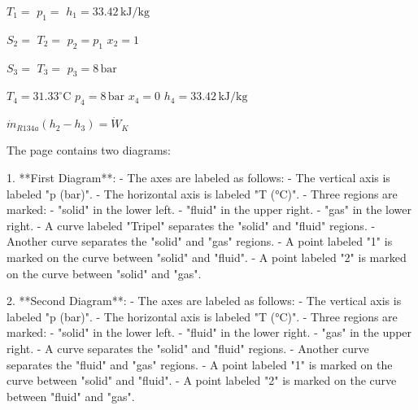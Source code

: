 \( T_1 = \)  
\( p_1 = \)  
\( h_1 = 33.42 \, \text{kJ/kg} \)  

\( S_2 = \)  
\( T_2 = \)  
\( p_2 = p_1 \)  
\( x_2 = 1 \)  

\( S_3 = \)  
\( T_3 = \)  
\( p_3 = 8 \, \text{bar} \)  

\( T_4 = 31.33^\circ \text{C} \)  
\( p_4 = 8 \, \text{bar} \)  
\( x_4 = 0 \)  
\( h_4 = 33.42 \, \text{kJ/kg} \)  

\( \dot{m}_{R134a} (h_2 - h_3) = \dot{W}_K \)

The page contains two diagrams:

1. **First Diagram**:
   - The axes are labeled as follows:
     - The vertical axis is labeled "p (bar)".
     - The horizontal axis is labeled "T (°C)".
   - Three regions are marked:
     - "solid" in the lower left.
     - "fluid" in the upper right.
     - "gas" in the lower right.
   - A curve labeled "Tripel" separates the "solid" and "fluid" regions.
   - Another curve separates the "solid" and "gas" regions.
   - A point labeled "1" is marked on the curve between "solid" and "fluid".
   - A point labeled "2" is marked on the curve between "solid" and "gas".

2. **Second Diagram**:
   - The axes are labeled as follows:
     - The vertical axis is labeled "p (bar)".
     - The horizontal axis is labeled "T (°C)".
   - Three regions are marked:
     - "solid" in the lower left.
     - "fluid" in the lower right.
     - "gas" in the upper right.
   - A curve separates the "solid" and "fluid" regions.
   - Another curve separates the "fluid" and "gas" regions.
   - A point labeled "1" is marked on the curve between "solid" and "fluid".
   - A point labeled "2" is marked on the curve between "fluid" and "gas".
